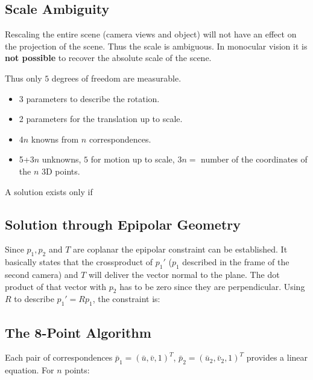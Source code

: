 \documentclass[10pt,a4paper]{scrartcl}
\begin{document}
\begin{multicols*}{2}
\subsection{Scale Ambiguity}

Rescaling the entire scene (camera views and object) will not have an effect on the projection of the scene. Thus the scale is ambiguous. In monocular vision it is \textbf{not possible} to recover the absolute scale of the scene.

\vspace{3ex}

Thus only $5$ degrees of freedom are measurable.

\begin{itemize}
\item 3 parameters to describe the rotation.
\item 2 parameters for the translation up to scale.
\item 4$n$ knowns from $n$ correspondences.
\item 5+3$n$ unknowns, $5$ for motion up to scale, $3n=$ number of the coordinates of the $n$ 3D points.
\end{itemize}

A solution exists only if


\subsection{Solution through Epipolar Geometry}


Since $p_1,p_2$ and $T$ are coplanar the epipolar constraint can be established. It basically states that the crossproduct of $p_1'$ ($p_1$ described in the frame of the second camera) and $T$ will deliver the vector normal to the plane. The dot product of that vector with $p_2$ has to be zero since they are perpendicular. Using $R$ to describe $p_1' = Rp_1$, the constraint is:


\subsection{The 8-Point Algorithm}


Each pair of correspondences $\bar{p}_1=(\bar{u},\bar{v},1)^T$, $\bar{p}_2=(\bar{u}_2,\bar{v}_2,1)^T$ provides a linear equation. For $n$ points:


\end{multicols*}
\end{document}

